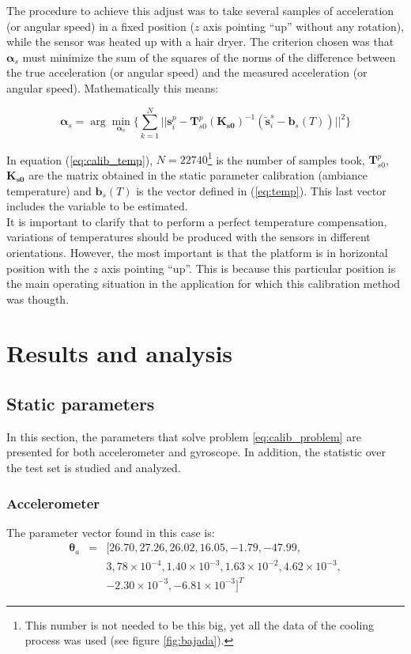 \documentclass[conference]{IEEEtran}
\newcommand{\refp}[1]{(\ref{#1})}
\begin{document}
The procedure to achieve this adjust was to take several samples of acceleration (or angular speed) in a fixed position ($z$ axis pointing ``up'' without any rotation), while the sensor was heated up with a hair dryer. The criterion chosen was that $\boldsymbol{\alpha}_s$ must minimize the sum of the squares of the norms of the difference between the true acceleration (or angular speed) and the measured acceleration (or angular speed). Mathematically this means:

\begin{equation}
\boldsymbol{\alpha}_s = \arg \min_{\boldsymbol{\alpha}_s} \lbrace \sum_{k=1}^N ||\mathbf{s}_i^p - \mathbf{T}_{s0}^p(\mathbf{K_{s0}})^{-1}(\tilde{\mathbf{s}}_i^s-\mathbf{b}_s(T))||^2 \rbrace
\label{eq:calib_temp}
\end{equation}

In equation \refp{eq:calib_temp}, $N = 22740$\footnote{This number is not needed to be this big, yet all the data of the cooling process was used (see figure \ref{fig:bajada}).} is the number of samples took, $\mathbf{T}_{s0}^p$, $\mathbf{K_{s0}}$ are the matrix obtained in the static parameter calibration (ambiance temperature) and $\mathbf{b}_s(T)$ is the vector defined in \refp{eq:temp}. This last vector includes the variable to be estimated.\\

It is important to clarify that to perform a perfect temperature compensation, variations of temperatures should be produced with the sensors in different orientations. However, the most important is that the platform is in horizontal position with the $z$ axis pointing ``up''. This is because this particular position is the main operating situation in the application for which this calibration method was thougth.
\section{Results and analysis}
\subsection{Static parameters}
In this section, the parameters that solve problem \ref{eq:calib_problem} are presented for both accelerometer and gyroscope. In addition, the statistic over the test set is studied and analyzed. \\

\subsubsection{Accelerometer}
The parameter vector found in this case is:
\begin{eqnarray}
\boldsymbol{\theta}_a &=& [26.70, 27.26, 26.02, 16.05, -1.79, -47.99,\\ \nonumber
&& 3,78\times 10^{-4}, 1.40\times 10^{-3}, 1.63 \times 10^{-2},  4.62 \times 10^{-3},\\ \nonumber
&& -2.30\times 10^{-3}, -6.81 \times 10^{-3}]^T \nonumber
\end{eqnarray}
\end{document}
